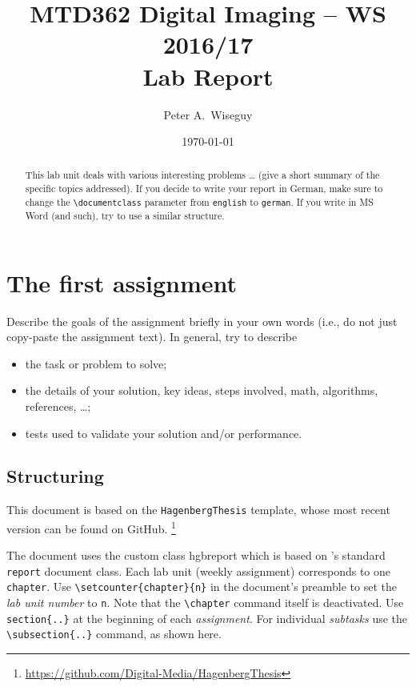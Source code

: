 \documentclass[english,notitlepage,smartquotes]{hgbreport}
\author{Peter A.\ Wiseguy}
\title{MTD362 Digital Imaging -- WS 2016/17\\
				Lab Report \arabic{chapter}}
\date{\today}
\renewcommand{\chapter}[1]{}	%
\begin{document}
\maketitle

\begin{abstract}\noindent
This lab unit deals with various interesting problems  \ldots 
(give a short summary of the specific topics addressed).
If you decide to write your report in German, make sure to
change the \verb!\documentclass! parameter from \texttt{english}
to \texttt{german}.
If you write in MS Word (and such), try to use a similar structure.
\end{abstract}



\section{The first assignment}

Describe the goals of the assignment briefly in your own words
(i.e., do not just copy-paste the assignment text).
In general, try to describe
\begin{itemize}
\item
	the task or problem to solve;
\item
	the details of your solution, key ideas, steps involved, math, algorithms,
	references, \ldots ;
\item
	tests used to validate your solution and/or performance.
\end{itemize}

\subsection{Structuring}	%

This \latex document is based on the \texttt{HagenbergThesis} 
template, whose most recent version can be found on GitHub.%
\footnote{\url{https://github.com/Digital-Media/HagenbergThesis}}

The document uses the custom class \textsf{hgbreport} which is based
on \latex's standard \texttt{report} document class. Each lab unit 
(weekly assignment) corresponds to one \texttt{chapter}.
Use \verb!\setcounter{chapter}{n}! in the document's preamble
to set the \emph{lab unit number} to \texttt{n}.
Note that the \verb!\chapter! command itself is deactivated.
Use \verb!section{..}! at the beginning of each \emph{assignment}.
For individual \emph{subtasks} use the 
\verb!\subsection{..}! command, as shown here.
\end{document}
